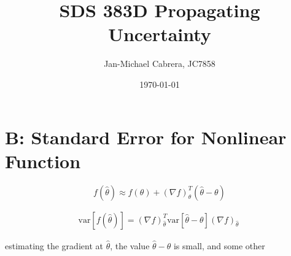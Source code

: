 \documentclass[12pt]{article}
\newcommand{\var}{\text{var}}
\begin{document}
    \title{SDS 383D Propagating Uncertainty}
    \author{Jan-Michael Cabrera, JC7858}
    \date{\today}
    \maketitle

    \section*{B: Standard Error for Nonlinear Function}

    	\begin{equation}
    		f(\hat{\theta}) \approx f(\theta) + (\nabla f)_{\theta}^T(\hat{\theta} - \theta)
    	\end{equation}

    	\begin{align}
    		\var[f(\hat{\theta})] = (\nabla f)_{\hat{\theta}}^T \var[ \hat{\theta} - \theta] (\nabla f)_{\hat{\theta}} \
    	\end{align}

    	estimating the gradient at $\hat{\theta}$, the value $\hat{\theta} - \theta$ is small, and some other

        
\end{document}
